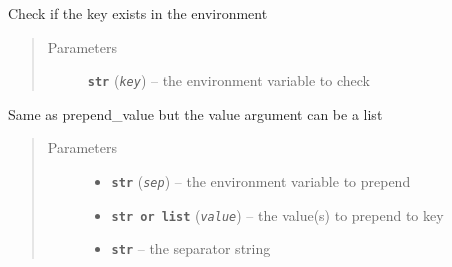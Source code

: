 \documentclass[a4paper,10pt,english]{sphinxmanual}
\begin{document}
\begin{fulllineitems}
\begin{fulllineitems}
\begin{quote}
\begin{description}
\end{description}\end{quote}

\end{fulllineitems}


\begin{fulllineitems}
\label{commands/apidoc/src:src.environment.Environ.is_defined}
Check if the key exists in the environment
\begin{quote}\begin{description}
\item[{Parameters}] \leavevmode
\textbf{\texttt{str}} (\emph{\texttt{key}}) -- the environment variable to check

\end{description}\end{quote}

\end{fulllineitems}


\begin{fulllineitems}
\label{commands/apidoc/src:src.environment.Environ.prepend}
Same as prepend\_value but the value argument can be a list
\begin{quote}\begin{description}
\item[{Parameters}] \leavevmode\begin{itemize}
\item {} 
\textbf{\texttt{str}} (\emph{\texttt{sep}}) -- the environment variable to prepend

\item {} 
\textbf{\texttt{str or list}} (\emph{\texttt{value}}) -- the value(s) to prepend to key

\item {} 
\textbf{\texttt{str}} -- the separator string

\end{itemize}

\end{description}\end{quote}

\end{fulllineitems}


\end{fulllineitems}
\end{document}
